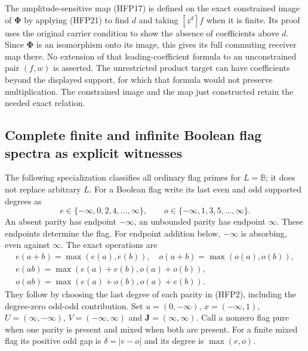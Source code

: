 The amplitude-sensitive map (HFP17) is defined on the exact
constrained image of $\boldsymbol\Phi$ by applying (HFP21)
to find $d$ and taking $[z^d]f$ when it is finite. Its proof
uses the original carrier condition to show the absence
of coefficients above $d$. Since $\boldsymbol\Phi$ is an
isomorphism onto its image, this gives its full commuting
receiver map there. No extension of that leading-coefficient
formula to an unconstrained pair $(f,w)$ is asserted.
The unrestricted product target can have coefficients beyond
the displayed support, for which that formula would not
preserve multiplication. The constrained image and the
map just constructed retain the needed exact relation.

\subsection{Complete finite and infinite Boolean flag spectra as explicit witnesses}

The following specialization classifies all ordinary flag
primes for $L=\mathbb B$; it does not replace arbitrary $L$.
For a Boolean flag write its last even and odd supported
degrees as
\begin{equation}\tag{HFP22}
 e\in\{-\infty,0,2,4,\ldots,\infty\},\qquad
 o\in\{-\infty,1,3,5,\ldots,\infty\}.
\end{equation}
An absent parity has endpoint $-\infty$, an unbounded parity
has endpoint $\infty$. These endpoints determine the flag.
For endpoint addition below, $-\infty$ is absorbing, even
against $\infty$. The exact operations are
\begin{equation}\tag{HFP23}
\begin{gathered}
 e(a+b)=\max(e(a),e(b)),\quad o(a+b)=\max(o(a),o(b)),\\
 e(ab)=\max(e(a)+e(b),o(a)+o(b)),\\
 o(ab)=\max(e(a)+o(b),o(a)+e(b)).
\end{gathered}
\end{equation}
They follow by choosing the last degree of each parity in
(HFP2), including the degree-zero odd-odd contribution.
Set $u=(0,-\infty)$, $x=(-\infty,1)$,
$U=(\infty,-\infty)$, $V=(-\infty,\infty)$ and
$\mathbf J=(\infty,\infty)$. Call a nonzero flag pure when
one parity is present and mixed when both are present. For
a finite mixed flag its positive odd gap is
$\delta=|e-o|$ and its degree is $\max(e,o)$.

